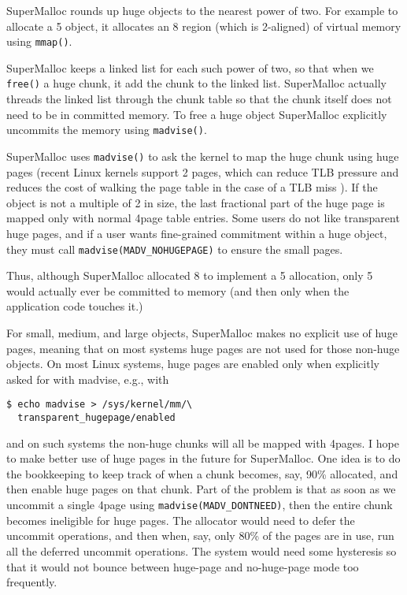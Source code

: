 \documentclass[natbib,sort&compress,10pt]{sigplanconf}
\newcommand{\code}[1]{\texttt{#1}}
\begin{document}
SuperMalloc rounds up huge objects to the nearest power of two.  For
example to allocate a \unit{5}\mebi\byte{} object, it allocates an
\unit{8}\mebi\byte{} region (which is \unit{2}\mebi\byte{}-aligned) of
virtual memory using \code{mmap()}.

SuperMalloc keeps a linked list for each such power of two, so that
when we \code{free()} a huge chunk, it add the chunk to the linked
list.  SuperMalloc actually threads the linked list through the chunk
table so that the chunk itself does not need to be in committed
memory.  To free a huge object SuperMalloc explicitly uncommits the
memory using \code{madvise()}.

SuperMalloc uses \code{madvise()} to ask the kernel to map the huge
chunk using huge pages (recent Linux kernels support
\unit{2}\mebi\byte{} pages, which can reduce TLB pressure and reduces
the cost of walking the page table in the case of a TLB miss
\cite{Corbet11}).  If the object is not a multiple of
\unit{2}\mebi\byte{} in size, the last fractional part of the huge
page is mapped only with normal \unit{4}\kibi\byte page table entries.
Some users do not like transparent huge pages, and if a user wants
fine-grained commitment within a huge object, they must call
\code{madvise(MADV\_NOHUGEPAGE)} to ensure the small pages.

Thus, although SuperMalloc allocated \unit{8}\mebi\byte{} to implement
a \unit{5}\mebi\byte{} allocation, only \unit{5}\mebi\byte{} would
actually ever be committed to memory (and then only when the
application code touches it.)

For small, medium, and large objects, SuperMalloc makes no explicit
use of huge pages, meaning that on most systems huge pages are not
used for those non-huge objects.  On most Linux systems, huge pages are enabled
only when explicitly asked for with madvise, e.g., with
\begin{verbatim}
$ echo madvise > /sys/kernel/mm/\
  transparent_hugepage/enabled
\end{verbatim}
and on such systems the non-huge chunks will all be mapped with
\unit{4}\kibi\byte pages.  I hope to make better use of huge pages in
the future for SuperMalloc.  One idea is to do the bookkeeping to keep
track of when a chunk becomes, say, 90\% allocated, and then enable
huge pages on that chunk.  Part of the problem is that as soon as we
uncommit a single \unit{4}\kibi\byte page using
\code{madvise(MADV\_DONTNEED)}, then the entire chunk becomes
ineligible for huge pages.  The allocator would need to defer the
uncommit operations, and then when, say, only 80\% of the pages are in
use, run all the deferred uncommit operations.  The system would need
some hysteresis so that it would not bounce between huge-page and
no-huge-page mode too frequently.
\end{document}
